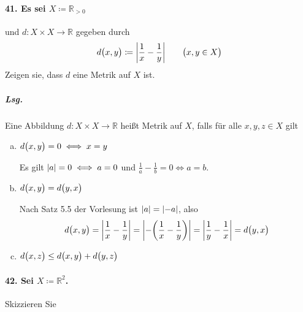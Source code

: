 \documentclass{scrreprt}
\begin{document}
\newpage
\paragraph{41. Es sei $X \coloneqq \mathbb{R}_{> 0}$} und
$d \colon X \times X \to \mathbb{R}$ gegeben durch
\[
  d\qty\big(x, y) \coloneqq \abs{\frac{1}{x} - \frac{1}{y}}
  \qquad \qty\big(x, y \in X)
\]
Zeigen sie, dass $d$ eine Metrik auf $X$ ist.

\subparagraph{Lsg.} Eine Abbildung $d \colon X \times X \to \mathbb{R}$
heißt Metrik auf $X$, falls für alle $x, y, z \in X$ gilt
\begin{enumerate}[(a)]
\item $d\qty\big(x, y) = 0 \iff x = y$

  Es gilt $\abs{a} = 0 \iff a = 0$ und
  $\frac{1}{a} - \frac{1}{b} = 0 \iff a = b$.
\item $d\qty\big(x, y) = d\qty\big(y, x)$

  Nach Satz 5.5 der Vorlesung ist $\abs{a} = \abs{-a}$, also
  \[
    d\qty\big(x, y) = \abs{\frac{1}{x} - \frac{1}{y}}
    = \abs{-\qty(\frac{1}{x} - \frac{1}{y})}
    = \abs{\frac{1}{y} - \frac{1}{x}}
    = d\qty\big(y, x)
  \]
\item $d\qty\big(x, z) \leq d\qty\big(x, y) + d\qty\big(y, z)$

\end{enumerate}



\newpage
\paragraph{42. Sei $X \coloneqq \mathbb{R}^2$.}
Skizzieren Sie
\end{document}
